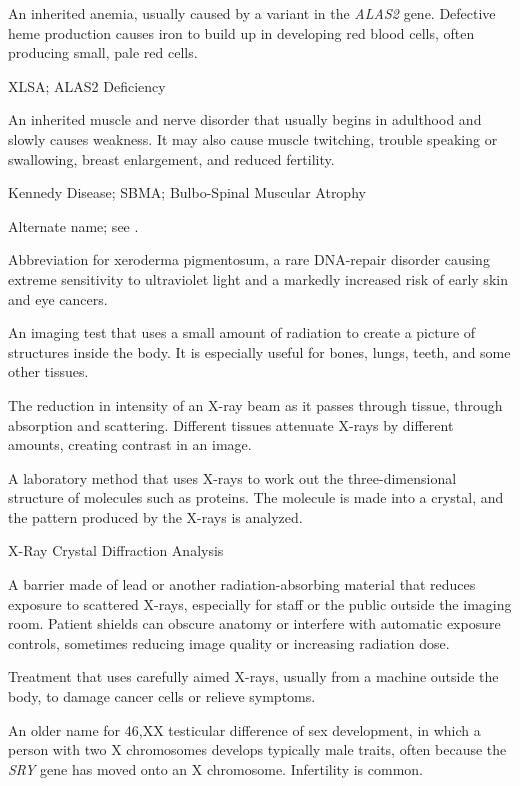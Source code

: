  An inherited anemia, usually caused by a variant in the \textit{ALAS2} gene. Defective heme production causes iron to build up in developing red blood cells, often producing small, pale red cells.

\synonyms
XLSA; ALAS2 Deficiency

 An inherited muscle and nerve disorder that usually begins in adulthood and slowly causes weakness. It may also cause muscle twitching, trouble speaking or swallowing, breast enlargement, and reduced fertility.

\synonyms
Kennedy Disease; SBMA; Bulbo-Spinal Muscular Atrophy

 Alternate name; see .

 Abbreviation for xeroderma pigmentosum, a rare DNA-repair disorder causing extreme sensitivity to ultraviolet light and a markedly increased risk of early skin and eye cancers.

 An imaging test that uses a small amount of radiation to create a picture of structures inside the body. It is especially useful for bones, lungs, teeth, and some other tissues.

 The reduction in intensity of an X-ray beam as it passes through tissue, through absorption and scattering. Different tissues attenuate X-rays by different amounts, creating contrast in an image.

 A laboratory method that uses X-rays to work out the three-dimensional structure of molecules such as proteins. The molecule is made into a crystal, and the pattern produced by the X-rays is analyzed.

\synonyms
X-Ray Crystal Diffraction Analysis

 A barrier made of lead or another radiation-absorbing material that reduces exposure to scattered X-rays, especially for staff or the public outside the imaging room. Patient shields can obscure anatomy or interfere with automatic exposure controls, sometimes reducing image quality or increasing radiation dose.

 Treatment that uses carefully aimed X-rays, usually from a machine outside the body, to damage cancer cells or relieve symptoms.

 An older name for 46,XX testicular difference of sex development, in which a person with two X chromosomes develops typically male traits, often because the \textit{SRY} gene has moved onto an X chromosome. Infertility is common.

